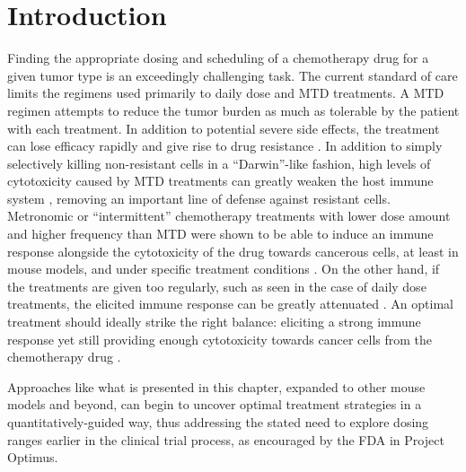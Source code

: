 \section{Introduction}
Finding the appropriate dosing and scheduling of a chemotherapy drug for a given tumor type is an exceedingly challenging task. The current standard of care limits the regimens used primarily to daily dose and \ac{MTD} treatments. A \ac{MTD} regimen attempts to reduce the tumor burden as much as tolerable by the patient with each treatment. In addition to potential severe side effects, the treatment can lose efficacy rapidly and give rise to drug resistance \cite{zahreddine2013mechanisms,kareva2015metronomic,shah2016limiting}. In addition to simply selectively killing non-resistant cells in a ``Darwin''-like fashion, high levels of cytotoxicity caused by \ac{MTD} treatments can greatly weaken the host immune system \cite{kareva2015metronomic}, removing an important line of defense against resistant cells. Metronomic or ``intermittent'' chemotherapy treatments with lower dose amount and higher frequency than \ac{MTD} were shown to be able to induce an immune response alongside the cytotoxicity of the drug towards cancerous cells, at least in mouse models, and under specific treatment conditions \cite{kepp2009immunogenic,kepp2011molecular,doloff2012vegf,kroemer2013immunogenic,vacchelli2014trial,bracci2014immune,wu2014metronomic,chen2014intermittent,bezu2015combinatorial,wu2015metronomic,wu2016metronomic}. On the other hand, if the treatments are given too regularly, such as seen in the case of daily dose treatments, the elicited immune response can be greatly attenuated \cite{wu2014metronomic}. An optimal treatment should ideally strike the right balance: eliciting a strong immune response yet still providing enough cytotoxicity towards cancer cells from the chemotherapy drug \cite{park2019goldilocks,tran2020delicate}.

Approaches like what is presented in this chapter, expanded to other mouse models and beyond, can begin to uncover optimal treatment strategies in a quantitatively-guided way,
thus addressing the stated need to explore dosing ranges earlier in the clinical trial process, as encouraged by the \ac{FDA} in Project Optimus.

